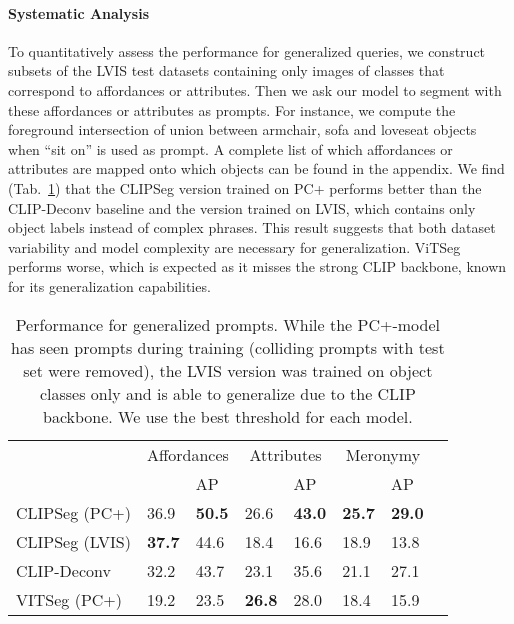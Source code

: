 \documentclass[10pt,twocolumn,letterpaper]{article}
\begin{document}
\paragraph{Systematic Analysis}
To quantitatively assess the performance for generalized queries, we construct subsets of the LVIS test datasets containing only images of classes that correspond to affordances or attributes.
Then we ask our model to segment with these affordances or attributes as prompts. For instance, we compute the foreground intersection of union between armchair, sofa and loveseat objects when ``sit on'' is used as prompt.
A complete list of which affordances or attributes are mapped onto which objects can be found in the appendix.
We find (Tab.~\ref{tab:generalize}) that the CLIPSeg version trained on PC+ performs better than the CLIP-Deconv baseline and the version trained on LVIS, which contains only object labels instead of complex phrases. This result suggests that both dataset variability and model complexity are necessary for generalization. 
ViTSeg performs worse, which is expected as it misses the strong CLIP backbone, known for its generalization capabilities.



\begin{table}
    \centering
    \footnotesize
    \begin{tabular}{llllllll}
        \toprule
         & \multicolumn{2}{c}{Affordances} & \multicolumn{2}{c}{Attributes} & \multicolumn{2}{c}{Meronymy}  \\
        &   &  AP &  & AP &   & AP \\
        \midrule
CLIPSeg (PC+) & 36.9 & \textbf{50.5} & 26.6 & \textbf{43.0} & \textbf{25.7} & \textbf{29.0} \\ 
CLIPSeg (LVIS)  & \textbf{37.7} & 44.6 & 18.4 & 16.6 & 18.9 & 13.8 \\ 
CLIP-Deconv & 32.2 & 43.7 & 23.1 & 35.6 & 21.1 & 27.1 \\ 
VITSeg (PC+) & 19.2 & 23.5 & \textbf{26.8} & 28.0 & 18.4 & 15.9 \\
         \bottomrule
    \end{tabular}\caption{Performance for generalized prompts. While the PC+-model has seen prompts during training (colliding prompts with test set were removed), the LVIS version was trained on object classes only and is able to generalize due to the CLIP backbone. We use the best threshold  for each model.}
    \label{tab:generalize}
\end{table}
\end{document}
